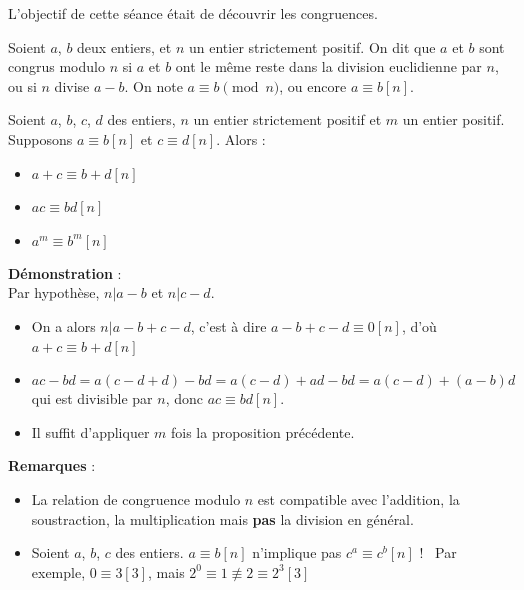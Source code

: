 L'objectif de cette séance était de découvrir les congruences.

\smallskip

\begin{dfn}
Soient $a$, $b$ deux entiers, et $n$ un entier strictement positif. On dit que $a$ et $b$ sont congrus modulo $n$ si $a$ et $b$ ont le même reste dans la division euclidienne par $n$, ou si $n$ divise $a - b$.
On note $a \equiv b \pmod{n}$, ou encore $a \equiv b [n]$.
\end{dfn}
\smallskip


\begin{pro}
Soient $a$, $b$, $c$, $d$ des entiers, $n$ un entier strictement positif et $m$ un entier positif. Supposons $a \equiv b [n]$ et $c \equiv d [n]$. Alors :
\begin{itemize}
    \item $a + c \equiv b + d [n]$\
    \item $ac \equiv bd [n]$\
    \item $a^m\equiv b^m [n]$ 
\end{itemize}
\end{pro}
\smallskip

\textbf{Démonstration} :\\
Par hypothèse, $n|a-b$ et $n|c-d$.
\begin{itemize}
    \item On a alors $n|a-b+c-d$, c'est à dire $a-b+c-d\equiv 0[n]$, d'où $a+c\equiv b+d [n]$\
    \item $ac - bd = a(c - d + d) - bd = a(c - d) + ad - bd = a(c - d) + (a - b)d$ qui est divisible par $n$, donc $ac \equiv bd [n]$.\
    \item Il suffit d'appliquer $m$ fois la proposition précédente.\
\end{itemize}

\bigskip

\textbf{Remarques} :
\begin{itemize}
    \item La relation de congruence modulo $n$ est compatible avec l’addition, la soustraction, la multiplication mais \textbf{pas} la division en général.\
    \item Soient $a$, $b$, $c$ des entiers.
    \newline
    $a\equiv b[n]$ n'implique pas $c^a\equiv c^b[n]$ !\
    \newline
    Par exemple, $0\equiv 3[3]$, mais $2^0\equiv 1\not\equiv 2\equiv 2^3[3]$
\end{itemize}

